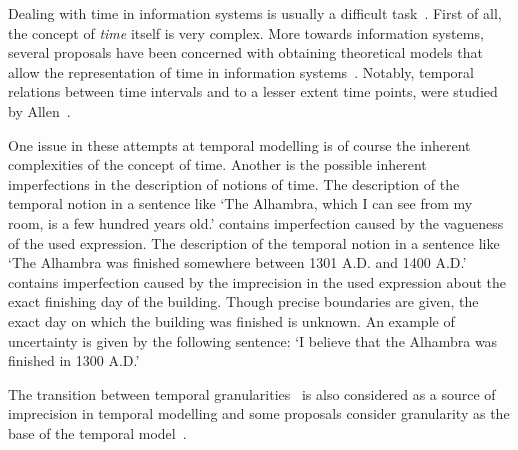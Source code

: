 Dealing with time in information systems is usually a difficult task~\cite{Bolour82}.
First of all, the concept of \emph{time} itself is very complex. More towards information systems, several proposals have been concerned with obtaining theoretical models that allow the representation of time in information systems~\cite{Cru97}. Notably, temporal relations between time intervals and to a lesser extent time points, were studied by Allen~\cite{Allen83}.


One issue in these attempts at temporal modelling is of course the inherent complexities of the concept of time. Another is the possible inherent imperfections in the description of notions of time. The description of the temporal notion in a sentence like `The Alhambra, which I can see from my room, is a few hundred years old.' contains imperfection caused by the vagueness of the used expression. The description of the temporal notion in a sentence like `The Alhambra was finished somewhere between 1301 A.D. and 1400 A.D.' contains imperfection caused by the imprecision in the used expression about the exact finishing day of the building. Though precise boundaries are given, the exact day on which the building was finished is unknown. An example of uncertainty is given by the following sentence: `I believe that the Alhambra was finished in 1300 A.D.'

The transition between temporal granularities~\cite{Lin97} is also considered as a source of imprecision in temporal modelling and some proposals consider granularity as the base of the temporal model~\cite{Cru97}.



